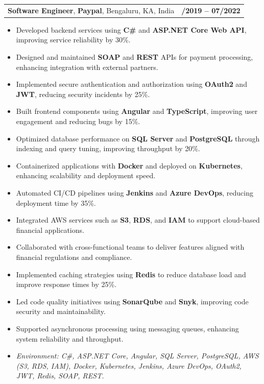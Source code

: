 \documentclass[letterpaper,11pt]{article}
\makeatletter
\newcommand{\resumeItem}[1]{
  \item\footnotesize{
    {#1 \vspace{-2pt}}
  }
}
\newcommand{\resumeSubheading}[4]{
  \vspace{-2pt}\item
    \begin{tabular*}{1.0\textwidth}[t]{l@{\extracolsep{\fill}}r}
      \textbf{\fontsize{10pt}{14pt}\selectfont #3}, \textbf{\fontsize{10pt}{14pt}\selectfont #1}, \fontsize{10pt}{14pt}\selectfont #4 & \textbf{\fontsize{10pt}{14pt}\selectfont #2} \\
    \end{tabular*}\vspace{-7pt}
}
\newcommand{\resumeItemListStart}{\begin{itemize}[leftmargin=*]}
\newcommand{\resumeItemListEnd}{\end{itemize}\vspace{-5pt}}
\makeatother
\begin{document}
\resumeSubheading
{Paypal}{08/2019 -- 07/2022}
{Software Engineer}{Bengaluru, KA, India}
\resumeItemListStart
  \resumeItem{Developed backend services using \textbf{C\#} and \textbf{ASP.NET Core Web API}, improving service reliability by 30\%.}
  \resumeItem{Designed and maintained \textbf{SOAP} and \textbf{REST} APIs for payment processing, enhancing integration with external partners.}
  \resumeItem{Implemented secure authentication and authorization using \textbf{OAuth2} and \textbf{JWT}, reducing security incidents by 25\%.}
  \resumeItem{Built frontend components using \textbf{Angular} and \textbf{TypeScript}, improving user engagement and reducing bugs by 15\%.}
  \resumeItem{Optimized database performance on \textbf{SQL Server} and \textbf{PostgreSQL} through indexing and query tuning, improving throughput by 20\%.}
  \resumeItem{Containerized applications with \textbf{Docker} and deployed on \textbf{Kubernetes}, enhancing scalability and deployment speed.}
  \resumeItem{Automated CI/CD pipelines using \textbf{Jenkins} and \textbf{Azure DevOps}, reducing deployment time by 35\%.}
  \resumeItem{Integrated AWS services such as \textbf{S3}, \textbf{RDS}, and \textbf{IAM} to support cloud-based financial applications.}
  \resumeItem{Collaborated with cross-functional teams to deliver features aligned with financial regulations and compliance.}
  \resumeItem{Implemented caching strategies using \textbf{Redis} to reduce database load and improve response times by 25\%.}
  \resumeItem{Led code quality initiatives using \textbf{SonarQube} and \textbf{Snyk}, improving code security and maintainability.}
  \resumeItem{Supported asynchronous processing using messaging queues, enhancing system reliability and throughput.}
  \resumeItem{\textit{Environment: C\#, ASP.NET Core, Angular, SQL Server, PostgreSQL, AWS (S3, RDS, IAM), Docker, Kubernetes, Jenkins, Azure DevOps, OAuth2, JWT, Redis, SOAP, REST.}}
\resumeItemListEnd
\end{document}
